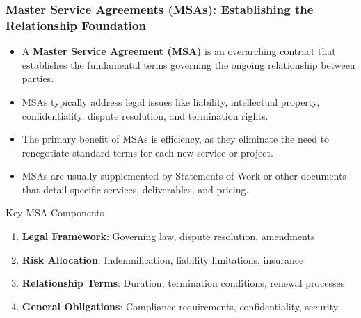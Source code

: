 \documentclass{beamer}
\begin{document}
\begin{frame}
    \frametitle{Master Service Agreements (MSAs): Establishing the Relationship Foundation}
    
    \begin{itemize}
        \item A \textbf{Master Service Agreement (MSA)} is an overarching contract that establishes the fundamental terms governing the ongoing relationship between parties.
        \item MSAs typically address legal issues like liability, intellectual property, confidentiality, dispute resolution, and termination rights.
        \item The primary benefit of MSAs is efficiency, as they eliminate the need to renegotiate standard terms for each new service or project.
        \item MSAs are usually supplemented by Statements of Work or other documents that detail specific services, deliverables, and pricing.
    \end{itemize}
    
    \begin{block}{Key MSA Components}
        \scriptsize
        \begin{enumerate}
            \item \textbf{Legal Framework}: Governing law, dispute resolution, amendments
            \item \textbf{Risk Allocation}: Indemnification, liability limitations, insurance
            \item \textbf{Relationship Terms}: Duration, termination conditions, renewal processes
            \item \textbf{General Obligations}: Compliance requirements, confidentiality, security
        \end{enumerate}
    \end{block}
\end{frame}
\end{document}
